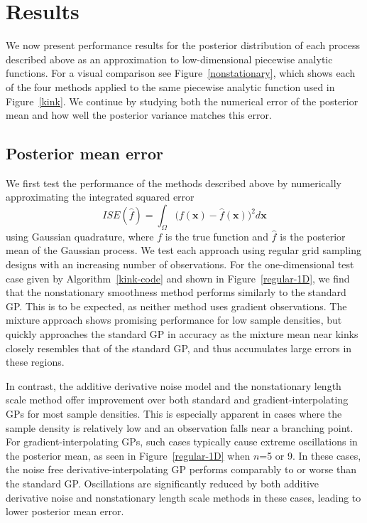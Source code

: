 \documentclass{article}
\renewcommand{\vec}[1]{\mathbf{#1}}
\numberwithin{equation}{section}
\begin{document}
\section{Results}
We now present performance results for the posterior distribution of each process described above as an approximation to low-dimensional piecewise analytic functions. For a visual comparison see Figure~\ref{nonstationary}, which shows each of the four methods applied to the same piecewise analytic function used in Figure~\ref{kink}. We continue by studying both the numerical error of the posterior mean and how well the posterior variance matches this error.

\subsection{Posterior mean error}
We first test the performance of the methods described above by numerically approximating the integrated squared error
$$ ISE(\hat{f}) = \int_\Omega \Big(f(\vec{x})- \hat{f}(\vec{x})\Big)^2 d\vec{x} $$
using Gaussian quadrature, where $f$ is the true function and $\hat{f}$ is the posterior mean of the Gaussian process. We test each approach using regular grid sampling designs with an increasing number of observations. For the one-dimensional test case given by Algorithm~\ref{kink-code} and shown in Figure~\ref{regular-1D}, we find that the nonstationary smoothness method performs similarly to the standard GP. This is to be expected, as neither method uses gradient observations. The mixture approach shows promising performance for low sample densities, but quickly approaches the standard GP in accuracy as the mixture mean near kinks closely resembles that of the standard GP, and thus accumulates large errors in these regions.

In contrast, the additive derivative noise model and the nonstationary length scale method offer improvement over both standard and gradient-interpolating GPs for most sample densities. This is especially apparent in cases where the sample density is relatively low and an observation falls near a branching point. For gradient-interpolating GPs, such cases typically cause extreme oscillations in the posterior mean, as seen in Figure~\ref{regular-1D} when $n$=5 or 9. In these cases, the noise free derivative-interpolating GP performs comparably to or worse than the standard GP. Oscillations are significantly reduced by both additive derivative noise and nonstationary length scale methods in these cases, leading to lower posterior mean error.
\end{document}
